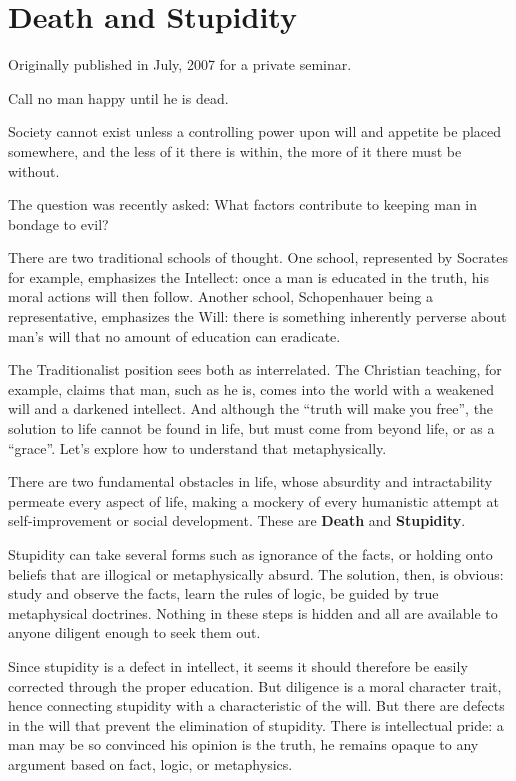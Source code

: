 \section{Death and Stupidity}

Originally published in July, 2007 for a private seminar.

\begin{quotex}
Call no man happy until he is dead.

Society cannot exist unless a controlling power upon will and appetite be placed somewhere, and the less of it there is within, the more of it there must be without.
\end{quotex}


The question was recently asked: What factors contribute to keeping man in bondage to evil?

There are two traditional schools of thought. One school, represented by Socrates for example, emphasizes the Intellect: once a man is educated in the truth, his moral actions will then follow. Another school, Schopenhauer being a representative, emphasizes the Will: there is something inherently perverse about man's will that no amount of education can eradicate.

The Traditionalist position sees both as interrelated. The Christian teaching, for example, claims that man, such as he is, comes into the world with a weakened will and a darkened intellect. And although the ``truth will make you free'', the solution to life cannot be found in life, but must come from beyond life, or as a ``grace''. Let's explore how to understand that metaphysically.

There are two fundamental obstacles in life, whose absurdity and intractability permeate every aspect of life, making a mockery of every humanistic attempt at self-improvement or social development. These are \textbf{Death} and \textbf{Stupidity}.

Stupidity can take several forms such as ignorance of the facts, or holding onto beliefs that are illogical or metaphysically absurd. The solution, then, is obvious: study and observe the facts, learn the rules of logic, be guided by true metaphysical doctrines. Nothing in these steps is hidden and all are available to anyone diligent enough to seek them out.

Since stupidity is a defect in intellect, it seems it should therefore be easily corrected through the proper education. But diligence is a moral character trait, hence connecting stupidity with a characteristic of the will. But there are defects in the will that prevent the elimination of stupidity. There is intellectual pride: a man may be so convinced his opinion is the truth, he remains opaque to any argument based on fact, logic, or metaphysics.

